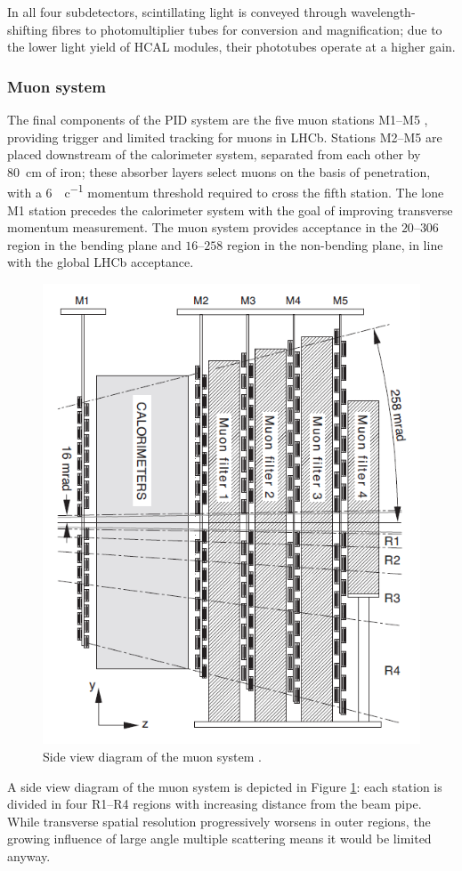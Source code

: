 In all four subdetectors, scintillating light is conveyed through wavelength-shifting fibres to photomultiplier tubes for conversion and magnification; due to the lower light yield of HCAL modules, their phototubes operate at a higher gain.

\subsubsection{Muon system}

The final components of the PID system are the five muon stations M1--M5 \cite{Barbosa-Marinho:504326}, providing trigger and limited tracking for muons in LHCb.
Stations M2--M5 are placed downstream of the calorimeter system, separated from each other by \SI{80}{\centi\meter} of iron;
these absorber layers select muons on the basis of penetration, with a \SI{6}{\gev\per c} momentum threshold required to cross the fifth station.
The lone M1 station precedes the calorimeter system with the goal of improving transverse momentum measurement.
The muon system provides acceptance in the $20$--$306$ \si{\mrad} region in the bending plane and $16$--$258$ \si{\mrad} region in the non-bending plane, in line with the global LHCb acceptance.

\begin{figure}[t]
	\centering
	\includegraphics[width=.5\textwidth]{graphics/02-lhcb/muon_side_view.png}
	\caption[Side view diagram of the muon system.]{Side view diagram of the muon system \cite{Alves:1129809}.}
	\label{fig:2:muon_side_view}
\end{figure}


A side view diagram of the muon system is depicted in Figure \ref{fig:2:muon_side_view}: each station is divided in four R1--R4 regions with increasing distance from the beam pipe.
While transverse spatial resolution progressively worsens in outer regions, the growing influence of large angle multiple scattering means it would be limited anyway.

